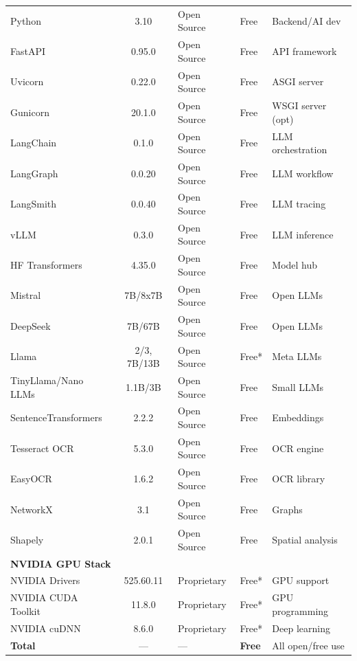 \documentclass[12pt]{report}
\begin{document}
\begin{table}[H]
\begin{tabular}{@{} l c l l l @{}}
    Python                  & 3.10 & Open Source & Free & Backend/AI dev \\
    FastAPI                 & 0.95.0 & Open Source & Free & API framework \\
    Uvicorn                 & 0.22.0 & Open Source & Free & ASGI server \\
    Gunicorn                & 20.1.0 & Open Source & Free & WSGI server (opt) \\
    LangChain               & 0.1.0 & Open Source & Free & LLM orchestration \\
    LangGraph               & 0.0.20 & Open Source & Free & LLM workflow \\
    LangSmith               & 0.0.40 & Open Source & Free & LLM tracing \\
    vLLM                    & 0.3.0 & Open Source & Free & LLM inference \\
    HF Transformers         & 4.35.0 & Open Source & Free & Model hub \\
    Mistral                 & 7B/8x7B & Open Source & Free & Open LLMs \\
    DeepSeek                & 7B/67B & Open Source & Free & Open LLMs \\
    Llama                   & 2/3, 7B/13B & Open Source & Free* & Meta LLMs \\
    TinyLlama/Nano LLMs     & 1.1B/3B & Open Source & Free & Small LLMs \\
    SentenceTransformers    & 2.2.2 & Open Source & Free & Embeddings \\
    Tesseract OCR           & 5.3.0 & Open Source & Free & OCR engine \\
    EasyOCR                 & 1.6.2 & Open Source & Free & OCR library \\
    NetworkX                & 3.1 & Open Source & Free & Graphs \\
    Shapely                 & 2.0.1 & Open Source & Free & Spatial analysis \\
    \midrule
    \multicolumn{5}{l}{\textbf{NVIDIA GPU Stack}} \\
    NVIDIA Drivers          & 525.60.11 & Proprietary & Free* & GPU support \\
    NVIDIA CUDA Toolkit     & 11.8.0 & Proprietary & Free* & GPU programming \\
    NVIDIA cuDNN            & 8.6.0 & Proprietary & Free* & Deep learning \\
    \midrule
    \textbf{Total}         & — & — & \textbf{Free} & All open/free use \\
    \bottomrule
  \end{tabular}
\end{table}
\end{document}
